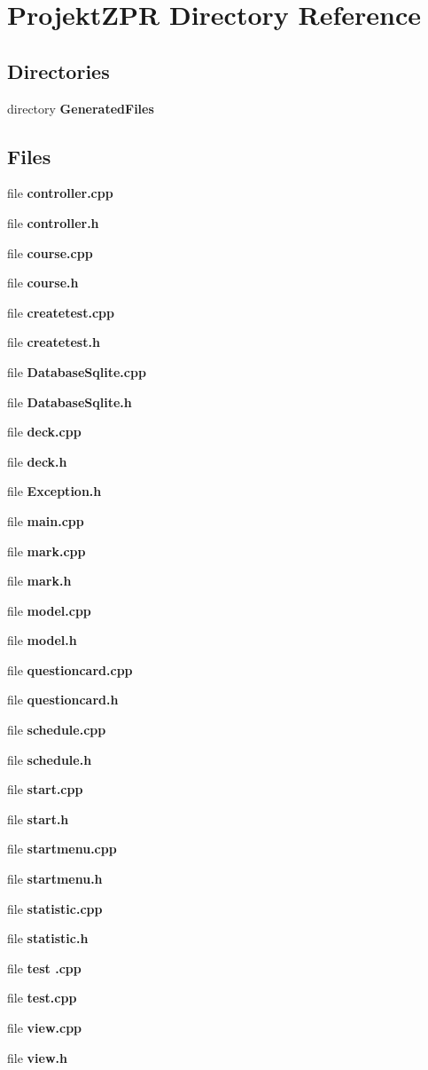 \section{Projekt\-Z\-P\-R Directory Reference}
\label{dir_6a9ed0a68af6f2f154417d988638fe82}
\subsection*{Directories}
\begin{DoxyCompactItemize}
\item 
directory {\bf Generated\-Files}
\end{DoxyCompactItemize}
\subsection*{Files}
\begin{DoxyCompactItemize}
\item 
file {\bf controller.\-cpp}
\item 
file {\bf controller.\-h}
\item 
file {\bf course.\-cpp}
\item 
file {\bf course.\-h}
\item 
file {\bf createtest.\-cpp}
\item 
file {\bf createtest.\-h}
\item 
file {\bf Database\-Sqlite.\-cpp}
\item 
file {\bf Database\-Sqlite.\-h}
\item 
file {\bf deck.\-cpp}
\item 
file {\bf deck.\-h}
\item 
file {\bf Exception.\-h}
\item 
file {\bf main.\-cpp}
\item 
file {\bf mark.\-cpp}
\item 
file {\bf mark.\-h}
\item 
file {\bf model.\-cpp}
\item 
file {\bf model.\-h}
\item 
file {\bf questioncard.\-cpp}
\item 
file {\bf questioncard.\-h}
\item 
file {\bf schedule.\-cpp}
\item 
file {\bf schedule.\-h}
\item 
file {\bf start.\-cpp}
\item 
file {\bf start.\-h}
\item 
file {\bf startmenu.\-cpp}
\item 
file {\bf startmenu.\-h}
\item 
file {\bf statistic.\-cpp}
\item 
file {\bf statistic.\-h}
\item 
file {\bf test .\-cpp}
\item 
file {\bf test.\-cpp}
\item 
file {\bf view.\-cpp}
\item 
file {\bf view.\-h}
\end{DoxyCompactItemize}
